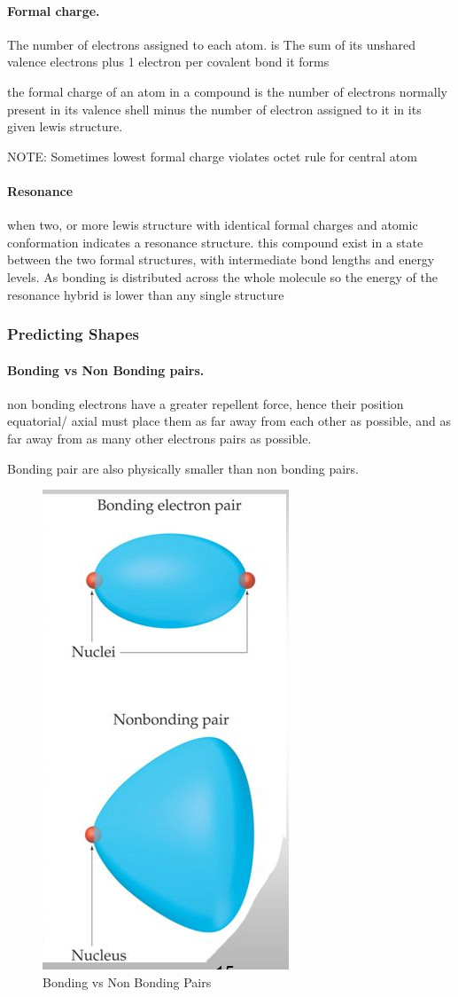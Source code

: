 \documentclass[]{article}
\let\oldparagraph\paragraph
\renewcommand{\paragraph}[1]{\oldparagraph{#1}\mbox{}}
\begin{document}
\hypertarget{formal-charge.}{%
\paragraph{Formal charge.}\label{formal-charge.}}

The number of electrons assigned to each atom. is The sum of its
unshared valence electrons plus 1 electron per covalent bond it forms

the formal charge of an atom in a compound is the number of electrons
normally present in its valence shell minus the number of electron
assigned to it in its given lewis structure.

NOTE: Sometimes lowest formal charge violates octet rule for central
atom

\hypertarget{resonance}{%
\paragraph{Resonance}\label{resonance}}

when two, or more lewis structure with identical formal charges and
atomic conformation indicates a resonance structure. this compound exist
in a state between the two formal structures, with intermediate bond
lengths and energy levels. As bonding is distributed across the whole
molecule so the energy of the resonance hybrid is lower than any single
structure

\hypertarget{predicting-shapes}{%
\subsubsection{Predicting Shapes}\label{predicting-shapes}}

\hypertarget{bonding-vs-non-bonding-pairs.}{%
\paragraph{Bonding vs Non Bonding
pairs.}\label{bonding-vs-non-bonding-pairs.}}

non bonding electrons have a greater repellent force, hence their
position equatorial/ axial must place them as far away from each other
as possible, and as far away from as many other electrons pairs as
possible.

Bonding pair are also physically smaller than non bonding pairs.

\begin{figure}
\centering
\includegraphics[width=\textwidth,height=0.5\textwidth]{Images/BondingVSNonBonding.jpg}
\caption{Bonding vs Non Bonding Pairs}
\end{figure}
\end{document}
